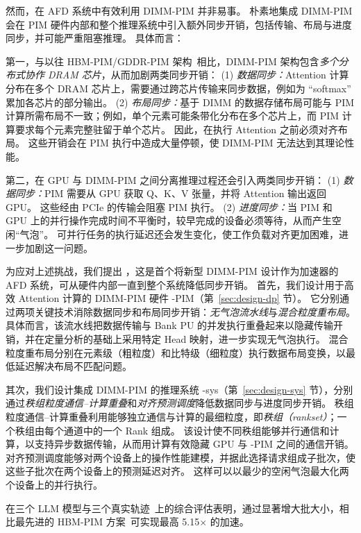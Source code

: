 然而，在 AFD 系统中有效利用 DIMM-PIM 并非易事。
朴素地集成 DIMM-PIM 会在 PIM 硬件内部和整个推理系统中引入额外同步开销，包括传输、布局与进度同步，并可能严重阻塞推理。
具体而言：

第一，与以往 HBM-PIM/GDDR-PIM 架构~\cite{he2025papi,heo2024neupims,park2024attacc,gu2025cent}相比，DIMM-PIM 架构包含\textit{多个分布式协作 DRAM 芯片}，从而加剧两类同步开销：
(1) \textit{数据同步：}Attention 计算分布在多个 DRAM 芯片上，需要通过跨芯片传输来同步数据，例如为 ``softmax'' 累加各芯片的部分输出。
(2) \textit{布局同步：}基于 DIMM 的数据存储布局可能与 PIM 计算所需布局不一致；例如，单个元素可能条带化分布在多个芯片上，而 PIM 计算要求每个元素完整驻留于单个芯片。
因此，在执行 Attention 之前必须对齐布局。
这些开销会在 PIM 执行中造成大量停顿，使 DIMM-PIM 无法达到其理论性能。

第二，在 GPU 与 DIMM-PIM 之间分离推理过程还会引入两类同步开销：
(1) \textit{数据同步：}PIM 需要从 GPU 获取 Q、K、V 张量，并将 Attention 输出返回 GPU。
这些经由 PCIe 的传输会阻塞 PIM 执行。
(2) \textit{进度同步：}当 PIM 和 GPU 上的并行操作完成时间不平衡时，较早完成的设备必须等待，从而产生空闲“气泡”。
可并行任务的执行延迟还会发生变化，使工作负载对齐更加困难，进一步加剧这一问题。

为应对上述挑战，我们提出 \sys，这是首个将新型 DIMM-PIM 设计作为加速器的 AFD 系统，可从硬件内部一直到整个系统降低同步开销。
首先，我们设计用于高效 Attention 计算的 DIMM-PIM 硬件 \sys-PIM（第~\ref{sec:design-dp} 节）。
它分别通过两项关键技术消除数据同步和布局同步开销：\emph{无气泡流水线}与\emph{混合粒度重布局}。
具体而言，该流水线把数据传输与 Bank PU 的并发执行重叠起来以隐藏传输开销，并在定量分析的基础上采用特定 Head 映射，进一步实现无气泡执行。
混合粒度重布局分别在元素级（粗粒度）和比特级（细粒度）执行数据布局变换，以最低延迟解决布局不匹配问题。

其次，我们设计集成 DIMM-PIM 的推理系统 \sys-sys（第~\ref{sec:design-sys} 节），分别通过\emph{秩组粒度通信--计算重叠}和\emph{对齐预测调度}降低数据同步与进度同步开销。
秩组粒度通信--计算重叠利用能够独立通信与计算的最细粒度，即\emph{秩组（rankset）}；一个秩组由每个通道中的一个 Rank 组成。
该设计使不同秩组能够并行通信和计算，以支持异步数据传输，从而用计算有效隐藏 GPU 与 \sys-PIM 之间的通信开销。
对齐预测调度能够对两个设备上的操作性能建模，并据此选择请求组成子批次，使这些子批次在两个设备上的预测延迟对齐。
这样可以以最少的空闲气泡最大化两个设备上的并行执行。

在三个 LLM 模型与三个真实轨迹~\cite{open-r1,dophin,OpenThoughts-114k-math,bai2024longbench}上的综合评估表明，\sys 通过显著增大批大小，相比最先进的 HBM-PIM 方案~\cite{heo2024neupims,park2024attacc}可实现最高 5.15$\times$ 的加速。
